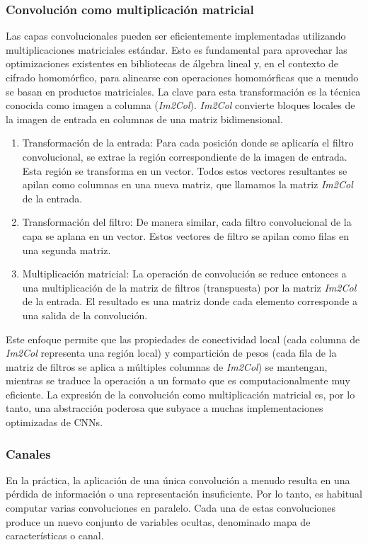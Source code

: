\subsubsection{Convolución como multiplicación matricial}

Las capas convolucionales pueden ser eficientemente implementadas utilizando multiplicaciones matriciales estándar. Esto es fundamental para aprovechar las optimizaciones existentes en bibliotecas de álgebra lineal y, en el contexto de cifrado homomórfico, para alinearse con operaciones homomórficas que a menudo se basan en productos matriciales. La clave para esta transformación es la técnica conocida como imagen a columna (\textit{Im2Col}). \textit{Im2Col} convierte bloques locales de la imagen de entrada en columnas de una matriz bidimensional.

\begin{enumerate}
    \item Transformación de la entrada: Para cada posición donde se aplicaría el filtro convolucional, se extrae la región correspondiente de la imagen de entrada. Esta región se transforma en un vector. Todos estos vectores resultantes se apilan como columnas en una nueva matriz, que llamamos la matriz \textit{Im2Col} de la entrada.
    \item Transformación del filtro: De manera similar, cada filtro convolucional de la capa se aplana en un vector. Estos vectores de filtro se apilan como filas en una segunda matriz.
    \item Multiplicación matricial: La operación de convolución se reduce entonces a una multiplicación de la matriz de filtros (transpuesta) por la matriz \textit{Im2Col} de la entrada. El resultado es una matriz donde cada elemento corresponde a una salida de la convolución.
\end{enumerate}

Este enfoque permite que las propiedades de conectividad local (cada columna de \textit{Im2Col} representa una región local) y compartición de pesos (cada fila de la matriz de filtros se aplica a múltiples columnas de \textit{Im2Col}) se mantengan, mientras se traduce la operación a un formato que es computacionalmente muy eficiente. La expresión de la convolución como multiplicación matricial es, por lo tanto, una abstracción poderosa que subyace a muchas implementaciones optimizadas de CNNs.

\subsubsection{Canales}
En la práctica, la aplicación de una única convolución a menudo resulta en una pérdida de información o una representación insuficiente. Por lo tanto, es habitual computar varias convoluciones en paralelo. Cada una de estas convoluciones produce un nuevo conjunto de variables ocultas, denominado mapa de características o canal.

